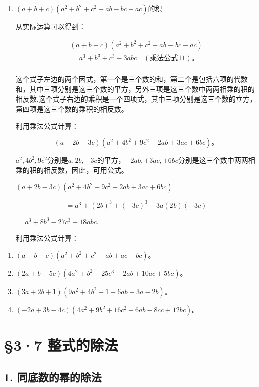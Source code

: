 \begin{enumerate}[start=6,label={*\arabic*.}]
\item
\((a + b + c)(a^2 + b^2 + c^2 - ab - bc - ac)\)的积

从实际运算可以得到：

\[
\begin{array}{l} (a + b + c) \left(a ^{2} + b ^{2} + c ^{2} - a b - b c - a c\right) \\ = a ^{3} + b ^{3} + c ^{3} - 3 a b c \quad (\text{乘法公式11})\text{。} \\ \end{array}
\]

这个式子左边的两个因式，第一个是三个数的和，第二个是包括六项的代数和，其中三项分别是这三个数的平方，另外三项是这三个数中两两相乘的积的相反数.这个式子右边的乘积是一个四项式，其中三项分别是这三个数的立方，第四项是这三个数的乘积的相反数。

 利用乘法公式计算：

\[
(a + 2 b - 3 c) (a ^{2} + 4 b ^{2} + 9 c ^{2} - 2 a b + 3 a c + 6 b c)\text{。}
\]

\(a^2, 4b^2, 9c^2\)分别是\(a, 2b, -3c\)的平方，\(-2ab, +3ac, +6bc\)分别是这三个数中两两相乘的积的相反数，因此，可用公式。

\((a + 2b - 3c)(a^2 + 4b^2 + 9c^2 - 2ab + 3ac + 6bc)\)

\[
= a ^{3} + (2 b) ^{3} + (- 3 c) ^{3} - 3 a (2 b) (- 3 c)
\]

\(= a^{3} + 8b^{3} - 27c^{3} + 18abc.\)

利用乘法公式计算：

\end{enumerate}
\begin{enumerate}[start=1]
\item
  \((a - b - c)(a^2 + b^2 + c^2 + ab + ac - bc)\)。
\item
  \((2a + b - 5c)(4a^2 + b^2 + 25c^3 - 2ab + 10ac + 5bc)\)。
\item
  \((3a + 2b + 1)(9a^2 + 4b^2 + 1 - 6ab - 3a - 2b)\)。
\item
  \((-2a + 3b - 4c)(4a^2 + 9b^2 + 16c^2 + 6ab - 8cc + 12bc)\)。
\end{enumerate}

\section{§3·7 整式的除法}

\subsection{1. 同底数的幂的除法}

